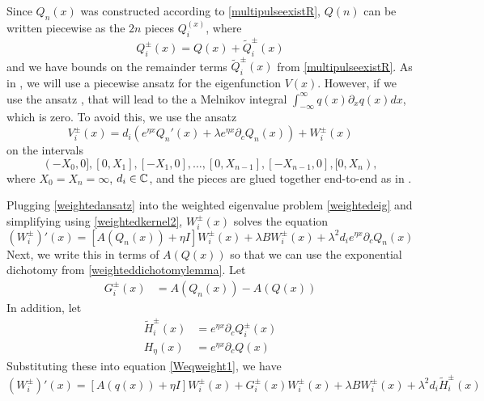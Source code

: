 \documentclass[thesis.tex]{subfiles}
\begin{document}
Since $Q_n(x)$ was constructed according to \cref{multipulseexistR}, $Q(n)$ can be written piecewise as the $2n$ pieces $Q_i^(x)$, where
\[
Q_i^\pm(x) = Q(x) + \tilde{Q}_i^\pm(x)
\]
and we have bounds on the remainder terms $\tilde{Q}_i^\pm(x)$ from \cref{multipulseexistR}. As in \cite{Sandstede1998}, we will use a piecewise ansatz for the eigenfunction $V(x)$. However, if we use the ansatz \cite[(3.5)]{Sandstede1998}, that will lead to the a Melnikov integral $\int_{-\infty}^\infty q(x)\partial_x q(x) dx$, which is zero. To avoid this, we use the ansatz
\begin{equation}\label{weightedansatz}
V_i^\pm(x) = d_i (e^{\eta x} Q_n'(x) + \lambda e^{\eta x} \partial_c Q_n(x)) + W_i^\pm(x)
\end{equation}
on the intervals 
\[
(-X_0, 0], [0, X_1], [-X_1, 0], \dots, [0, X_{n-1}], [-X_{n-1}, 0], [0, X_n),
\]
where $X_0 = X_n = \infty$, $d_i \in \mathbb{C}$, and the pieces are glued together end-to-end as in \cite{Sandstede1998}.

Plugging \cref{weightedansatz} into the weighted eigenvalue problem \cref{weightedeig} and simplifying using \cref{weightedkernel2}, $W_i^\pm(x)$ solves the equation
\begin{equation}\label{Weqweight1}
(W_i^\pm)'(x) = [A(Q_n(x)) + \eta I] W_i^\pm(x) + \lambda B W_i^\pm(x) + \lambda^2 d_i e^{\eta x} \partial_c Q_n(x)
\end{equation}
Next, we write this in terms of $A(Q(x))$ so that we can use the exponential dichotomy from \cref{weighteddichotomylemma}. Let
\begin{align*}
G_i^\pm(x) &= A(Q_n(x)) - A(Q(x))
\end{align*}
In addition, let
\begin{align*}
\tilde{H}_i^\pm(x) &= e^{\eta x} \partial_c Q_i^\pm(x) \\
H_\eta(x) &= e^{\eta x} \partial_c Q(x)
\end{align*}
Substituting these into equation \cref{Weqweight1}, we have
\begin{equation}\label{Weqweight2}
(W_i^\pm)'(x) = [A(q(x)) + \eta I] W_i^\pm(x)+ G_i^\pm(x)W_i^\pm(x) + \lambda B W_i^\pm(x) + \lambda^2 d_i \tilde{H}_i^\pm(x)
\end{equation}
\end{document}
